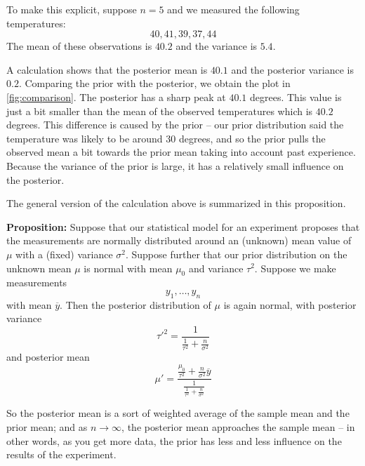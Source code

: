 \documentclass[
  oneside]{scrbook}
\begin{document}
To make this explicit, suppose \(n=5\) and we measured the following
temperatures: \[
40, 41,39, 37, 44
\] The mean of these observations is \(40.2\) and the variance is
\(5.4\).

A calculation shows that the posterior mean is \(40.1\) and the
posterior variance is \(0.2\). Comparing the prior with the posterior,
we obtain the plot in \cref{fig:comparison}. The posterior has a sharp
peak at \(40.1\) degrees. This value is just a bit smaller than the mean
of the observed temperatures which is \(40.2\) degrees. This difference
is caused by the prior -- our prior distribution said the temperature
was likely to be around \(30\) degrees, and so the prior pulls the
observed mean a bit towards the prior mean taking into account past
experience. Because the variance of the prior is large, it has a
relatively small influence on the posterior.

The general version of the calculation above is summarized in this
proposition.

\textbf{Proposition:} Suppose that our statistical model for an
experiment proposes that the measurements are normally distributed
around an (unknown) mean value of \(\mu\) with a (fixed) variance
\(\sigma^2\). Suppose further that our prior distribution on the unknown
mean \(\mu\) is normal with mean \(\mu_0\) and variance \(\tau^2\).
Suppose we make measurements \[
y_1,\ldots, y_n
\] with mean \(\overline{y}\). Then the posterior distribution of
\(\mu\) is again normal, with posterior variance \[
\tau'^2 = \frac{1}{\frac{1}{\tau^2}+\frac{n}{\sigma^2}}
\] and posterior mean \[
\mu' = \frac{\frac{\mu_0}{\tau^2}+\frac{n}{\sigma^2}\overline{y}}{\frac{1}{\frac{1}{\tau^2}+\frac{n}{\sigma^2}}}
\]

So the posterior mean is a sort of weighted average of the sample mean
and the prior mean; and as \(n\to\infty\), the posterior mean approaches
the sample mean -- in other words, as you get more data, the prior has
less and less influence on the results of the experiment.
\end{document}
